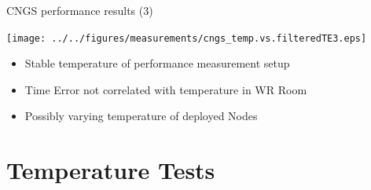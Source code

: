 \documentclass[compress,red]{beamer}
\begin{document}
\begin{frame}{CNGS performance results (3)}

	\begin{center}
		\texttt{[image: ../../figures/measurements/cngs\_temp.vs.filteredTE3.eps]}
	
		\begin{itemize}
			\item Stable temperature of performance measurement setup
			\item Time Error not correlated with temperature in WR Room
			\item Possibly varying temperature of deployed Nodes
		\end{itemize}	
		
	\end{center}




\end{frame}

\section{Temperature Tests}
\end{document}
